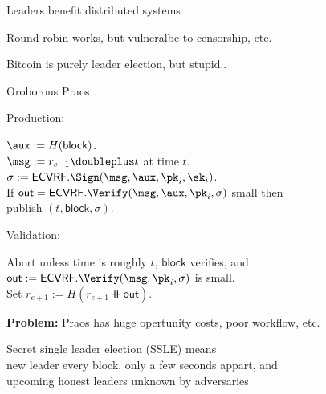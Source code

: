 \documentclass{beamer}
\begin{document}
\begin{frame}

Leaders benefit distributed systems \\ \bigskip\bigskip

Round robin works, but vulneralbe to censorship, etc. \\ \bigskip

Bitcoin is purely leader election, but stupid.. \\

\end{frame}



\begin{frame}

Oroborous Praos \\ \bigskip\bigskip

\def\out{\mathsf{out}}
Production: \\ \smallskip

$\aux := H(\mathsf{block})$. \\
$\msg := r_{e-1} \doubleplus t$ at time $t$. \\
$\sigma := \mathsf{ECVRF}.\Sign(\msg,\aux,\pk_i,\sk_i)$. \\
If $\out = \mathsf{ECVRF}.\Verify(\msg,\aux,\pk_i,\sigma)$ small then  \\
\hspace{10pt} publish $(t,\mathsf{block},\sigma)$. \\

\bigskip\bigskip

Validation: \\ \smallskip

Abort unless time is roughly $t$, $\mathsf{block}$ verifies, and \\
\hspace{10pt} $\out := \mathsf{ECVRF}.\Verify(\msg,\pk_i,\sigma)$ is small. \\
Set $r_{e+1} := H(r_{e+1} \doubleplus \out)$.



\end{frame}



\begin{frame}

{\bf Problem:}  Praos has huge opertunity costs, poor workflow, etc.

\bigskip\bigskip

Secret single leader election (SSLE) means \\ \medskip
\hspace{5pt} new leader every block, only a few seconds appart, and \\ \smallskip
\hspace{5pt} upcoming honest leaders unknown by adversaries

\end{frame}
\end{document}
